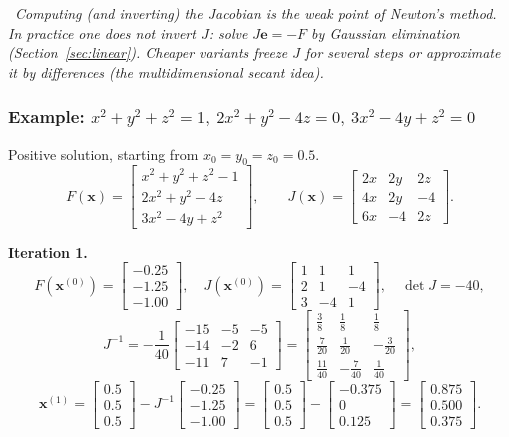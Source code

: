 \documentclass[hidelinks]{article}
\newcommand{\callout}[1]{\par\smallskip\noindent{\color{capri}$\blacktriangleright$}\ \textit{#1}\par\smallskip}
\begin{document}
\callout{Computing (and inverting) the Jacobian is the weak point of Newton's method. In practice one does not invert $J$: solve $J\mathbf e=-F$ by Gaussian elimination (Section~\ref{sec:linear}). Cheaper variants freeze $J$ for several steps or approximate it by differences (the multidimensional secant idea).}

\subsubsection{Example: $x^2+y^2+z^2=1,\ 2x^2+y^2-4z=0,\ 3x^2-4y+z^2=0$}

Positive solution, starting from $x_0=y_0=z_0=0.5$.
\[
F(\mathbf x)=\begin{bmatrix}x^2+y^2+z^2-1\\2x^2+y^2-4z\\3x^2-4y+z^2\end{bmatrix},\qquad
J(\mathbf x)=\begin{bmatrix}2x&2y&2z\\4x&2y&-4\\6x&-4&2z\end{bmatrix}.
\]

\textbf{Iteration 1.}
\[
F(\mathbf x^{(0)})=\begin{bmatrix}-0.25\\-1.25\\-1.00\end{bmatrix},\quad
J(\mathbf x^{(0)})=\begin{bmatrix}1&1&1\\2&1&-4\\3&-4&1\end{bmatrix},\quad \det J=-40,
\]
\[
J^{-1}=-\frac{1}{40}\begin{bmatrix}-15&-5&-5\\-14&-2&6\\-11&7&-1\end{bmatrix}
=\begin{bmatrix}\frac38&\frac18&\frac18\\[2pt]\frac7{20}&\frac1{20}&-\frac3{20}\\[2pt]\frac{11}{40}&-\frac7{40}&\frac1{40}\end{bmatrix},
\]
\[
\mathbf x^{(1)}=\begin{bmatrix}0.5\\0.5\\0.5\end{bmatrix}-J^{-1}\begin{bmatrix}-0.25\\-1.25\\-1.00\end{bmatrix}
=\begin{bmatrix}0.5\\0.5\\0.5\end{bmatrix}-\begin{bmatrix}-0.375\\0\\0.125\end{bmatrix}
=\begin{bmatrix}0.875\\0.500\\0.375\end{bmatrix}.
\]
\end{document}
